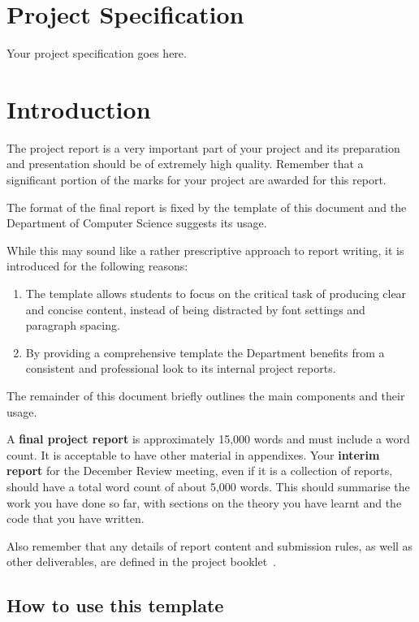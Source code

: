\documentclass[]{final_report}
\begin{document}

\chapter*{Project Specification}
Your project specification goes here.

\chapter{Introduction}

The project report is a very important part of your project and its preparation and presentation should be of extremely high quality. Remember that a significant portion of the marks for your project are awarded for this report. 

The format of the final report is fixed by the template of this document and the Department of Computer Science suggests its usage. 

While this may sound like a rather prescriptive approach to report writing, it is introduced for the following reasons:
\begin{enumerate}
 \item The template allows students to focus on the critical task of producing clear and concise content, instead of being distracted by font settings and paragraph spacing. 
 \item By providing a comprehensive template the Department benefits from a consistent and professional look to its internal project reports.
\end{enumerate}

The remainder of this document briefly outlines the main components and their usage.

A \textbf{final project report} is approximately 15,000 words and must include a word count. It is acceptable to have other material in appendixes.  
Your \textbf{interim report} for the December Review meeting, even if it is a collection of reports, should have a total word count of about 5,000 words. 
This should summarise the work you have done so far, with sections on the theory you have learnt and the code that you have written.

Also remember that any details of report content and submission rules, as well as other deliverables, are defined in the project booklet~\cite{COHEN:2013}.

\section{How to use this template}
\end{document}
